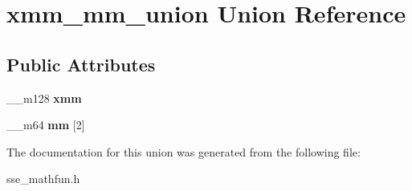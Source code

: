 \hypertarget{unionxmm__mm__union}{}\section{xmm\+\_\+mm\+\_\+union Union Reference}
\label{unionxmm__mm__union}
\subsection*{Public Attributes}
\begin{DoxyCompactItemize}
\item 
\mbox{\label{unionxmm__mm__union_a813c630f87af9e1a86b4e1dd9df90794}} 
\+\_\+\+\_\+m128 {\bfseries xmm}
\item 
\mbox{\label{unionxmm__mm__union_a99967e9b265807ef42865752687a891a}} 
\+\_\+\+\_\+m64 {\bfseries mm} \mbox{[}2\mbox{]}
\end{DoxyCompactItemize}


The documentation for this union was generated from the following file\+:\begin{DoxyCompactItemize}
\item 
sse\+\_\+mathfun.\+h\end{DoxyCompactItemize}
